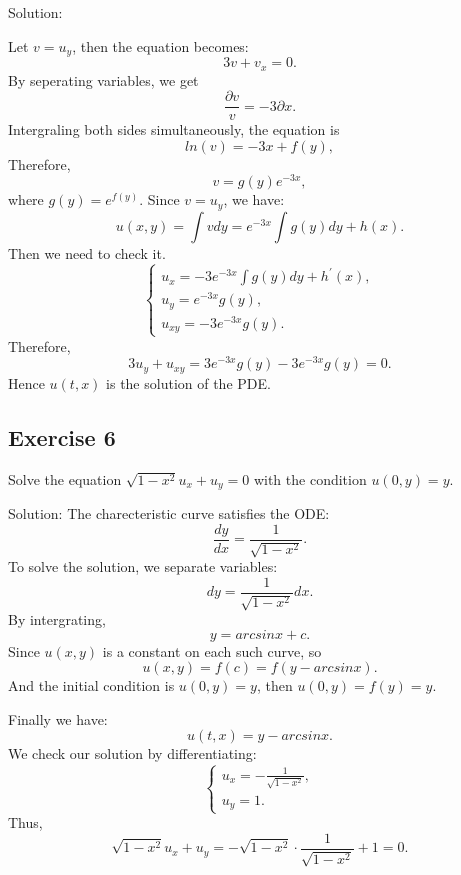 \documentclass{article}
\begin{document}
			Solution:

			Let $v=u_y$, then the equation becomes:
			\[3v+v_x=0.\]
			By seperating variables, we get \[\frac{\partial v}{v}=-3\partial x.\]
			Intergraling both sides simultaneously, the equation is \[ ln(v) = -3x + f(y),  \]
			Therefore, \[ v = g(y)e^{-3x},\]
			where $g(y)=e^{f(y)}$.
			Since $v=u_y$, we have:
			\[u(x,y)=\int vdy = e^{-3x}\int g(y)dy + h(x).\]
			Then we need to check it.
			\begin{equation*}
				\begin{cases}
					u_{x}=-3e^{-3x}\int g(y)dy + h^{'}(x),
					\\
					u_{y}=e^{-3x} g(y),
					\\
					u_{xy}=-3e^{-3x} g(y).
				\end{cases}
			\end{equation*}
			Therefore, \[3u_y + u_{xy}=3e^{-3x} g(y)-3e^{-3x} g(y)=0.\]
            Hence $u(t,x)$ is the solution of the PDE.


    \subsection{Exercise 6}
	Solve the equation $\sqrt{1-x^2}u_x+u_y=0$ with the condition $u(0, y)=y.$
		
            Solution: The charecteristic curve satisfies the ODE: 
            \[ \frac{dy}{dx}=\frac{1}{\sqrt{1-x^2}}.\]
			To solve the solution, we separate variables: 		
			\[ dy=\frac{1}{\sqrt{1-x^2}}dx.\]
			By intergrating, \[y= arcsinx + c .\]
			Since $u(x,y)$ is a constant on each such curve, so
			\[ u(x,y)=f(c)=f(y - arcsinx).\]
			And the initial condition is $u(0,y)=y$, then $u(0,y)=f(y)=y.$

			Finally we have:
			\[u(t,x)=y - arcsinx.\]
			We check our solution by differentiating:
			\begin{equation*}
				\begin{cases}
					u_x=-\frac{1}{\sqrt{1-x^2}},
					\\
					u_y=1.
				\end{cases}
			\end{equation*}
			Thus, \[\sqrt{1-x^2}u_x+u_y=-\sqrt{1-x^2} \cdot \frac{1}{\sqrt{1-x^2}}+1=0.\]
\end{document}
